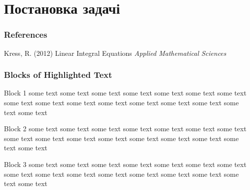 \documentclass{beamer}
\begin{document}
	\begin{frame}
		
	\end{frame}
	
	
	
	\section{Постановка задачі} 
	
	\begin{frame}
		
	\end{frame}
	

	
	
	\begin{frame}
		\frametitle{References}
		\footnotesize{
			\begin{thebibliography}{99} %
				 Kress, R. (2012)
				\newblock Linear Integral Equations
				\newblock \emph{Applied Mathematical Sciences}
			\end{thebibliography}
		}
	\end{frame}
	
	
	\begin{frame}
		\frametitle{Blocks of Highlighted Text}
		\begin{block}{Block 1}
			some text some text some text some text some text some text some text some text some text some text some text some text some text some text some text some text 
		\end{block}
		
		\begin{block}{Block 2}
			some text some text some text some text some text some text some text some text some text some text some text some text some text some text some text some text 
		\end{block}
		
		\begin{block}{Block 3}
			some text some text some text some text some text some text some text some text some text some text some text some text some text some text some text some text 
		\end{block}
	\end{frame}
	
\end{document}
